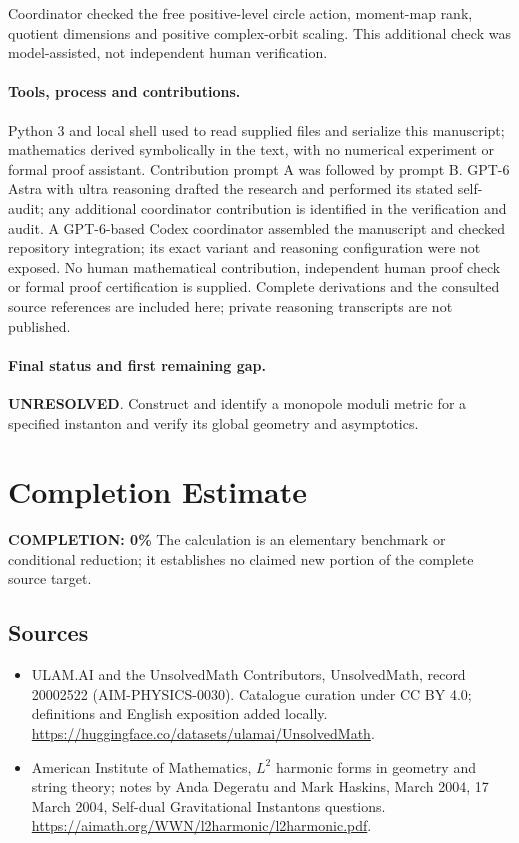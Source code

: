 \documentclass[11pt]{article}
\begin{document}
Coordinator checked the free positive-level circle action, moment-map rank, quotient dimensions and positive complex-orbit scaling. This additional check was model-assisted, not independent human verification.

\paragraph{Tools, process and contributions.}
Python 3 and local shell used to read supplied files and serialize this manuscript; mathematics derived symbolically in the text, with no numerical experiment or formal proof assistant. Contribution prompt A was followed by prompt B. GPT-6 Astra with ultra reasoning drafted the research and performed its stated self-audit; any additional coordinator contribution is identified in the verification and audit. A GPT-6-based Codex coordinator assembled the manuscript and checked repository integration; its exact variant and reasoning configuration were not exposed. No human mathematical contribution, independent human proof check or formal proof certification is supplied. Complete derivations and the consulted source references are included here; private reasoning transcripts are not published.

\paragraph{Final status and first remaining gap.}
\textbf{UNRESOLVED}. Construct and identify a monopole moduli metric for a specified instanton and verify its global geometry and asymptotics.

\section{Completion Estimate}
\noindent\textbf{COMPLETION: 0\%}
The calculation is an elementary benchmark or conditional reduction; it establishes no claimed new portion of the complete source target.

\subsection{Sources}
\begin{itemize}
\item[\hypertarget{source:20002522:1}{S1}] ULAM.AI and the UnsolvedMath Contributors, UnsolvedMath, record 20002522 (AIM-PHYSICS-0030). Catalogue curation under CC BY 4.0; definitions and English exposition added locally.
\url{https://huggingface.co/datasets/ulamai/UnsolvedMath}.
\item[\hypertarget{source:20002522:2}{S2}] American Institute of Mathematics, $L^2$ harmonic forms in geometry and string theory; notes by Anda Degeratu and Mark Haskins, March 2004, 17 March 2004, Self-dual Gravitational Instantons questions.
\url{https://aimath.org/WWN/l2harmonic/l2harmonic.pdf}.
\end{itemize}
\label{end:20002522}
\end{document}
